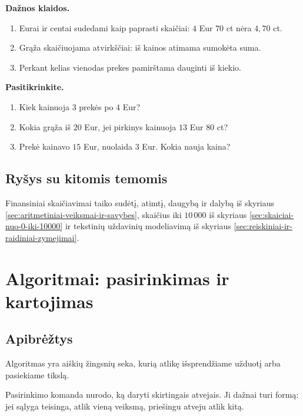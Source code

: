 \textbf{Dažnos klaidos.}
\begin{enumerate}[label=\arabic*.]
\item Eurai ir centai sudedami kaip paprasti skaičiai: \(4\) Eur \(70\) ct nėra \(4,70\) ct.
\item Grąža skaičiuojama atvirkščiai: iš kainos atimama sumokėta suma.
\item Perkant kelias vienodas prekes pamirštama dauginti iš kiekio.
\end{enumerate}

\textbf{Pasitikrinkite.}
\begin{enumerate}[label=\arabic*.]
\item Kiek kainuoja \(3\) prekės po \(4\) Eur?
\item Kokia grąža iš \(20\) Eur, jei pirkinys kainuoja \(13\) Eur \(80\) ct?
\item Prekė kainavo \(15\) Eur, nuolaida \(3\) Eur. Kokia nauja kaina?
\end{enumerate}

\subsection{Ryšys su kitomis temomis}

Finansiniai skaičiavimai taiko sudėtį, atimtį, daugybą ir dalybą iš skyriaus \ref{sec:aritmetiniai-veiksmai-ir-savybes}, skaičius iki \(10\,000\) iš skyriaus \ref{sec:skaiciai-nuo-0-iki-10000} ir tekstinių uždavinių modeliavimą iš skyriaus \ref{sec:reiskiniai-ir-raidiniai-zymejimai}.

\section{Algoritmai: pasirinkimas ir kartojimas}\label{sec:algoritmai-pasirinkimas-ir-kartojimas}

\subsection{Apibrėžtys}

\begin{apibreztis}
Algoritmas yra aiškių žingsnių seka, kurią atlikę išsprendžiame užduotį arba pasiekiame tikslą.
\end{apibreztis}

\begin{apibreztis}
Pasirinkimo komanda nurodo, ką daryti skirtingais atvejais. Ji dažnai turi formą: jei sąlyga teisinga, atlik vieną veiksmą, priešingu atveju atlik kitą.
\end{apibreztis}

